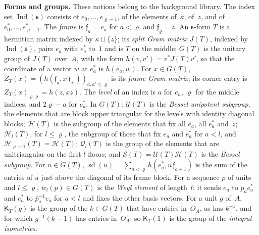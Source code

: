 \documentclass[11pt,a4paper]{article}
\newcommand{\m}[1]{\mbox{$#1$}}        %
\newcommand{\subhead}[1]{\par\addvspace{9pt plus 2pt}\Needspace{4\baselineskip}\noindent\textbf{#1}\enspace\ignorespaces}
\theoremstyle{plainx}
\theoremstyle{uprightx}
\newcommand{\fs}{\mathfrak{s}}                      %
\newcommand{\Ix}[1]{\operatorname{Ind}(#1)}                          %
\newcommand{\JT}[1]{J(#1)}                          %
\newcommand{\GT}[1]{G(#1)}                          %
\newcommand{\UT}[1]{\mathcal{U}(#1)}                %
\newcommand{\HT}[1]{\mathcal{H}(#1)}                %
\newcommand{\ST}[1]{\mathcal{S}(#1)}                %
\newcommand{\Hl}[2]{\mathcal{H}_{#1}(#2)}           %
\newcommand{\Ql}[2]{\mathcal{Q}_{#1}(#2)}           %
\newcommand{\sd}[1]{\operatorname{sd}(#1)}          %
\newcommand{\ZT}[2]{Z_{#1}(#2)}                     %
\newcommand{\weyl}[2]{w_{#1}(#2)}                   %
\newcommand{\uLev}[2]{\mathsf{K}_{#2}(#1)}                   %
\begin{document}
\subhead{Forms and groups.} These notions belong to the background library. The index set \m{\Ix{\fs}}
consists of \m{e_0,\dots,e_{\varrho-1}}, of the elements of~$\kappa$, of~$z$, and of
\m{e^*_0,\dots,e^*_{\varrho-1}}. The \emph{frame} is \m{\mathfrak f_a=e_a} for \m{a<\varrho} and \m{\mathfrak
f_{\varrho}=z}. An $\fs$-form $T$ is a hermitian matrix indexed by \m{\kappa\sqcup\{z\}}; its \emph{split Gram
matrix} \m{\JT{T}}, indexed by \m{\Ix{\fs}}, pairs $e_a$ with $e^*_a$ to~$1$ and is $T$ on the middle;
\m{\GT{T}} is the unitary group of \m{\JT{T}} over~$A$, with the form \m{h(v,v')=v^*\JT{T}v'}, so that the
coordinate of a vector $w$ at $e^*_a$ is \m{h(e_a,w)}. For \m{x\in\GT{T}},
\m{\ZT{T}{x}=(h(\mathfrak f_a,x\,\mathfrak f_{a'}))_{a,a'\le\varrho}} is its \emph{frame Gram matrix}; its corner
entry is \m{\ZT{T}{x}_{\varrho\varrho}=h(z,xz)}. The \emph{level} of an index is $a$ for $e_a$, $\varrho$ for the
middle indices, and \m{2\varrho-a} for $e^*_a$. In \m{\GT{T}}: \m{\UT{T}} is the \emph{Bessel unipotent
subgroup}, the elements that are block upper triangular for the levels with identity diagonal blocks;
\m{\HT{T}} is the subgroup of the elements that fix all $e_a$, all $e^*_a$ and~$z$; \m{\Hl{l}{T}}, for
\m{l\le\varrho}, the subgroup of those that fix $e_a$ and $e^*_a$ for \m{a<l}, and \m{\Hl{\varrho+1}{T}=\HT{T}};
\m{\Ql{l}{T}} is the group of the elements that are unitriangular on the first $l$ floors; and
\m{\ST{T}=\UT{T}\HT{T}} is the \emph{Bessel subgroup}. For \m{u\in\GT{T}}, \m{\sd{u}=\sum_{a<\varrho}h(e^*_a,u\,\mathfrak
f_{a+1})} is the sum of the entries of $u$ just above the diagonal of its frame block. For a sequence $p$ of
units and \m{l\le\varrho}, \m{\weyl{l}{p}\in\GT{T}} is the \emph{Weyl element} of length~$l$: it sends $e_a$ to
\m{p_ae^*_a} and $e^*_a$ to \m{\bar p_a^{-1}e_a} for \m{a<l} and fixes the other basis vectors. For a unit $g$
of~$A$, \m{\uLev{g}{T}} is the group of the \m{k\in\GT{T}} that have entries in~$O_A$, as has $k^{-1}$, and for
which \m{g^{-1}(k-1)} has entries in~$O_A$; so \m{\uLev{1}{T}} is the group of the \emph{integral isometries}.
\end{document}
